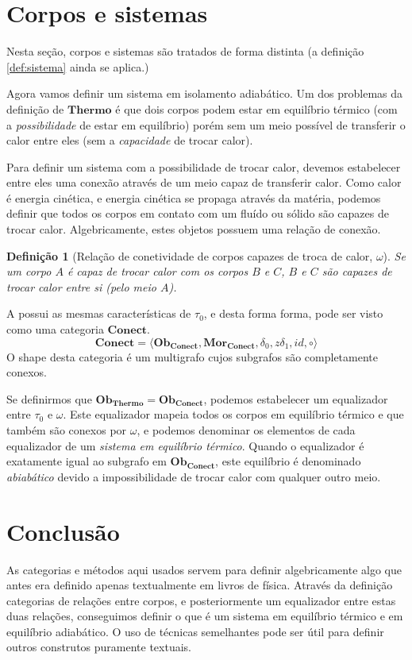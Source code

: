 \documentclass[a4paper]{article}
\newcommand{\trls}{{\tau_0}}
\newcommand{\termo}{{\mathbf{Thermo}}}
\newcommand{\obtermo}{{\mathbf{Ob}_\termo}}
\newcommand{\conect}{{\mathbf{Conect}}}
\newcommand{\morconect}{{\mathbf{Mor}_\conect}}
\newcommand{\obconect}{{\mathbf{Ob}_\conect}}
\newtheorem{definicao}{Definição}[section]
\begin{document}
\section*{Corpos e sistemas}
Nesta seção, corpos e sistemas são tratados de forma distinta (a definição \ref{def:sistema} ainda se aplica.)

Agora vamos definir um sistema em isolamento adiabático. Um dos problemas da definição de $\termo$ é que dois corpos podem estar em equilíbrio térmico (com a {\it possibilidade} de estar em equilíbrio) porém sem um meio possível de transferir o calor entre eles (sem a {\it capacidade} de trocar calor).

Para definir um sistema com a possibilidade de trocar calor, devemos estabelecer entre eles uma conexão através de um meio capaz de transferir calor. Como calor é energia cinética, e energia cinética se propaga através da matéria, podemos definir que todos os corpos em contato com um fluído ou sólido são capazes de trocar calor. Algebricamente, estes objetos possuem uma relação de conexão.

\begin{definicao}[Relação de conetividade de corpos capazes de troca de calor, $\omega$] \label{def:conect}
Se um corpo $A$ é capaz de trocar calor com os corpos $B$ e $C$, $B$ e $C$ são capazes de trocar calor entre si (pelo meio $A$).
\end{definicao}

A possui as mesmas características de $\trls$, e desta forma forma, pode ser visto como uma categoria $\conect$.
\begin{equation} \label{eq:conect}
\conect = \langle \obconect, \morconect, \delta_0, z\delta_1, id, \circ \rangle
\end{equation}
O shape desta categoria é um multigrafo cujos subgrafos são completamente conexos.

Se definirmos que $\obtermo = \obconect$, podemos estabelecer um equalizador entre $\trls$ e $\omega$. Este equalizador mapeia todos os corpos em equilíbrio térmico e que também são conexos por $\omega$, e podemos denominar os elementos de cada equalizador de um {\it sistema em equilíbrio térmico}. Quando o equalizador é exatamente igual ao subgrafo em $\obconect$, este equilíbrio é denominado {\it abiabático} devido a impossibilidade de trocar calor com qualquer outro meio.

\section*{Conclusão}
As categorias e métodos aqui usados servem para definir algebricamente algo que antes era definido apenas textualmente em livros de física. Através da definição categorias de relações entre corpos, e posteriormente um equalizador entre estas duas relações, conseguimos definir o que é um sistema em equilíbrio térmico e em equilíbrio adiabático. O uso de técnicas semelhantes pode ser útil para definir outros construtos puramente textuais.
\end{document}
